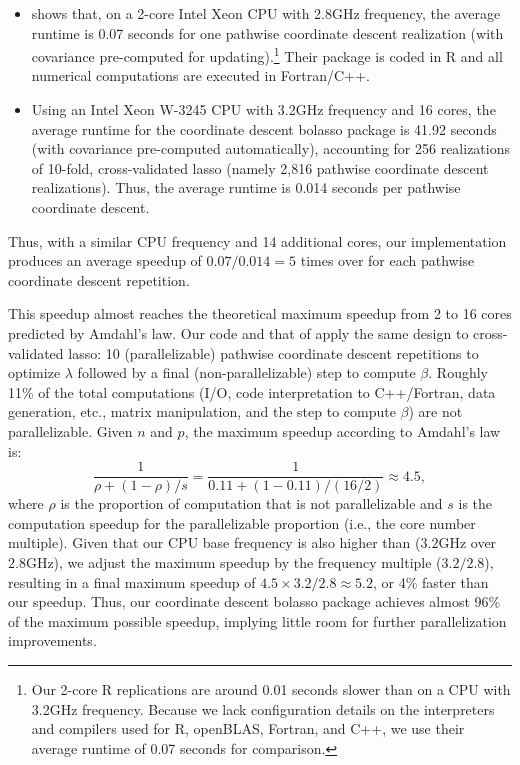 \documentclass[11pt,review,authoryear]{elsarticle}
\begin{document}
\begin{itemize}
  \item  \citet[Table 1]{friedman2010regularization} shows that, on a 2-core Intel Xeon CPU with 2.8GHz frequency, the average runtime is 0.07 seconds for one pathwise coordinate descent realization (with covariance pre-computed for updating).\footnote{Our 2-core R replications are around 0.01 seconds slower than \citet{friedman2010regularization} on a CPU with 3.2GHz frequency. Because we lack configuration details on the interpreters and compilers \citet{friedman2010regularization} used for R, openBLAS, Fortran, and C++, we use their average runtime of 0.07 seconds for comparison.} Their package is coded in R and all numerical computations are executed in Fortran/C++.
  \item  Using an Intel Xeon W-3245 CPU with 3.2GHz frequency and 16 cores, the average runtime for the coordinate descent bolasso package is 41.92 seconds (with covariance pre-computed automatically), accounting for 256 realizations of 10-fold, cross-validated lasso (namely 2,816 pathwise coordinate descent realizations). Thus, the average runtime is 0.014 seconds per pathwise coordinate descent.
\end{itemize}

\noindent
Thus, with a similar CPU frequency and 14 additional cores, our implementation produces an average speedup of $0.07/0.014=5$ times over \citet{friedman2010regularization} for each pathwise coordinate descent repetition.

This speedup almost reaches the theoretical maximum speedup from 2 to 16 cores predicted by Amdahl's law. Our code and that of \citet{friedman2010regularization} apply the same design to cross-validated lasso: 10 (parallelizable) pathwise coordinate descent repetitions to optimize $\lambda$ followed by a final (non-parallelizable) step to compute $\beta$. Roughly 11\% of the total computations (I/O, code interpretation to C++/Fortran, data generation, etc., matrix manipulation, and the step to compute $\beta$) are not parallelizable. Given $n$ and $p$, the maximum speedup according to Amdahl's law is:
%
\begin{equation}
  \frac{1}{\rho + (1-\rho)/s} = \frac{1}{0.11 + (1-0.11)/(16/2)} \approx 4.5,
\end{equation}
%
where $\rho$ is the proportion of computation that is not parallelizable and $s$ is the computation speedup for the parallelizable proportion (i.e., the core number multiple). Given that our CPU base frequency is also higher than \citet[Table 1]{friedman2010regularization} ($3.2$GHz over $2.8$GHz), we adjust the maximum speedup by the frequency multiple ($3.2/2.8$), resulting in a final maximum speedup of $4.5 \times 3.2/2.8 \approx 5.2$, or 4\% faster than our speedup. Thus, our coordinate descent bolasso package achieves almost 96\% of the maximum possible speedup, implying little room for further parallelization improvements.
\end{document}
